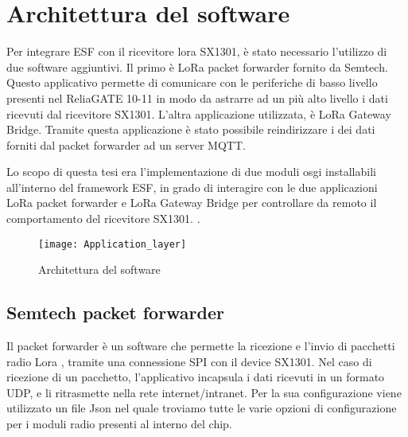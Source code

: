 \pagebreak


\section{Architettura del software}
Per integrare ESF con il ricevitore lora SX1301, è stato necessario l'utilizzo
di due software aggiuntivi.
Il primo è LoRa packet forwarder fornito da Semtech. Questo
applicativo permette di comunicare con le periferiche di basso livello presenti
nel ReliaGATE 10-11 in modo da astrarre ad un più alto livello i dati ricevuti dal
ricevitore SX1301.
L'altra applicazione utilizzata, è LoRa Gateway Bridge. Tramite questa
applicazione è stato possibile 
reindirizzare i dei dati forniti dal packet forwarder ad un server MQTT.

Lo scopo di questa tesi era l'implementazione  di  due moduli osgi 
installabili all'interno del framework ESF, in grado di interagire con le due
applicazioni LoRa packet forwarder e LoRa Gateway Bridge per controllare da
remoto il comportamento del ricevitore SX1301.  .

\begin{figure}[h]
        \centering 
                \texttt{[image: Application\_layer]}
        \caption{Architettura del software}
        \label{fig:Software_stack}
\end{figure}

\subsection{Semtech packet forwarder}
Il packet forwarder è un software che permette la ricezione e l'invio di pacchetti radio Lora ,
tramite una connessione SPI con il device SX1301. Nel caso di ricezione di un
pacchetto, l'applicativo incapsula i dati ricevuti in un formato UDP, e li
ritrasmette nella rete internet/intranet. Per la sua configurazione viene
utilizzato un file Json nel quale troviamo tutte le varie opzioni di
configurazione per i moduli radio presenti al interno del chip.
\inputminted[mathescape, gobble=2, frame=lines, linenos=true
framesep=2mm, firstline=1,lastline=23]{json}{Code_Files/global_json.conf}
\inputminted[mathescape, gobble=2, frame=lines, linenos=true
framesep=2mm, firstline=173,lastline=184]{json}{Code_Files/global_json.conf}

